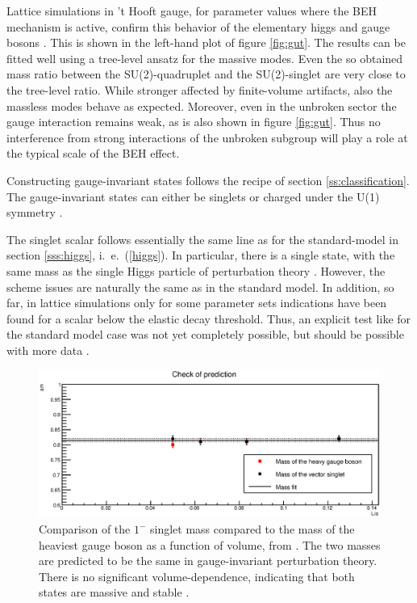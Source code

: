 \documentclass[final,12pt,3p,longtitle]{elsarticle}
\newcommand*{\pref}[1]{(\ref{#1})}
\newcommand*{\1}{1\!\!\!\bot}
\begin{document}
Lattice simulations in 't Hooft gauge, for parameter values where the BEH mechanism is active, confirm this behavior of the elementary higgs and gauge bosons \cite{Maas:2016ngo}. This is shown in the left-hand plot of figure \ref{fig:gut}. The results can be fitted well using a tree-level ansatz for the massive modes. Even the so obtained mass ratio between the SU(2)-quadruplet and the SU(2)-singlet are very close to the tree-level ratio. While stronger affected by finite-volume artifacts, also the massless modes behave as expected. Moreover, even in the unbroken sector the gauge interaction remains weak, as is also shown in figure \ref{fig:gut}. Thus no interference from strong interactions of the unbroken subgroup will play a role at the typical scale of the BEH effect.

Constructing gauge-invariant states follows the recipe of section \ref{ss:classification}. The gauge-invariant states can either be singlets or charged under the U(1) symmetry \cite{Maas:2017xzh}.

The singlet scalar follows essentially the same line as for the standard-model in section \ref{sss:higgs}, i.\ e.\ \pref{higgs}. In particular, there is a single state, with the same mass as the single Higgs particle of perturbation theory \cite{Torek:2015ssa,Maas:2016ngo,Maas:2017xzh}. However, the scheme issues are naturally the same as in the standard model. In addition, so far, in lattice simulations only for some parameter sets indications have been found for a scalar below the elastic decay threshold. Thus, an explicit test like for the standard model case was not yet completely possible, but should be possible with more data \cite{Maas:2016ngo,Maas:unpublishedtoerek}.

\begin{figure}
\begin{center}
\includegraphics[width=\linewidth]{EffMassFitParams}
\end{center}
\caption{\label{fig:gut2}Comparison of the $1^-$ singlet mass compared to the mass of the heaviest gauge boson as a function of volume, from \cite{Maas:2016ngo}. The two masses are predicted to be the same in gauge-invariant perturbation theory. There is no significant volume-dependence, indicating that both states are massive and stable \cite{Luscher:1985dn}.}
\end{figure}
\end{document}
